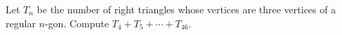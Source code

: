 Let $T_n$ be the number of right triangles whose vertices are three vertices of a regular $n$-gon. Compute $T_4+T_5+\cdots+T_{46}$.
